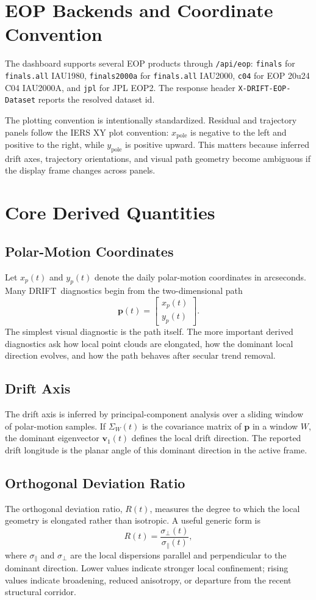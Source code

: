 \documentclass[11pt]{article}
\newcommand{\DRIFT}{\textsc{DRIFT}}
\newcommand{\Rratio}{R(t)}
\begin{document}
\section{EOP Backends and Coordinate Convention}
The dashboard supports several EOP products through \texttt{/api/eop}: \texttt{finals} for \texttt{finals.all} IAU1980, \texttt{finals2000a} for \texttt{finals.all} IAU2000, \texttt{c04} for EOP 20u24 C04 IAU2000A, and \texttt{jpl} for JPL EOP2. The response header \texttt{X-DRIFT-EOP-Dataset} reports the resolved dataset id.

The plotting convention is intentionally standardized. Residual and trajectory panels follow the IERS XY plot convention: \(x_{\mathrm{pole}}\) is negative to the left and positive to the right, while \(y_{\mathrm{pole}}\) is positive upward. This matters because inferred drift axes, trajectory orientations, and visual path geometry become ambiguous if the display frame changes across panels.

\section{Core Derived Quantities}
\subsection{Polar-Motion Coordinates}
Let \(x_p(t)\) and \(y_p(t)\) denote the daily polar-motion coordinates in arcseconds. Many \DRIFT\ diagnostics begin from the two-dimensional path
\[
\mathbf{p}(t)=\begin{bmatrix}x_p(t)\\y_p(t)\end{bmatrix}.
\]
The simplest visual diagnostic is the path itself. The more important derived diagnostics ask how local point clouds are elongated, how the dominant local direction evolves, and how the path behaves after secular trend removal.

\subsection{Drift Axis}
The drift axis is inferred by principal-component analysis over a sliding window of polar-motion samples. If \(\Sigma_W(t)\) is the covariance matrix of \(\mathbf{p}\) in a window \(W\), the dominant eigenvector \(\mathbf{v}_1(t)\) defines the local drift direction. The reported drift longitude is the planar angle of this dominant direction in the active frame.

\subsection{Orthogonal Deviation Ratio}
The orthogonal deviation ratio, \(\Rratio\), measures the degree to which the local geometry is elongated rather than isotropic. A useful generic form is
\[
R(t)=\frac{\sigma_{\perp}(t)}{\sigma_{\parallel}(t)},
\]
where \(\sigma_{\parallel}\) and \(\sigma_{\perp}\) are the local dispersions parallel and perpendicular to the dominant direction. Lower values indicate stronger local confinement; rising values indicate broadening, reduced anisotropy, or departure from the recent structural corridor.
\end{document}
